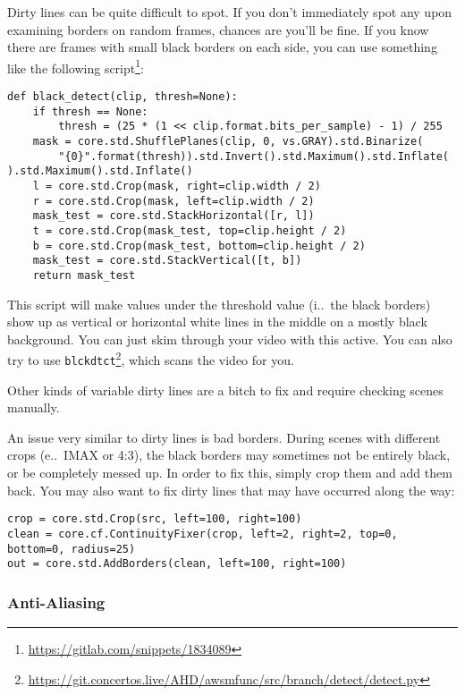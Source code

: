 \documentclass{scrartcl}
\begin{document}
Dirty lines can be quite difficult to spot.  If you don't immediately spot any upon examining borders on random frames, chances are you'll be fine.  If you know there are frames with small black borders on each side, you can use something like the following script\footnote{\url{https://gitlab.com/snippets/1834089}}:

\begin{lstlisting}
def black_detect(clip, thresh=None):
    if thresh == None:
        thresh = (25 * (1 << clip.format.bits_per_sample) - 1) / 255
    mask = core.std.ShufflePlanes(clip, 0, vs.GRAY).std.Binarize(
        "{0}".format(thresh)).std.Invert().std.Maximum().std.Inflate( ).std.Maximum().std.Inflate()
    l = core.std.Crop(mask, right=clip.width / 2)
    r = core.std.Crop(mask, left=clip.width / 2)
    mask_test = core.std.StackHorizontal([r, l])
    t = core.std.Crop(mask_test, top=clip.height / 2)
    b = core.std.Crop(mask_test, bottom=clip.height / 2)
    mask_test = core.std.StackVertical([t, b])
    return mask_test
\end{lstlisting}
This script will make values under the threshold value (i.\@e.\ the black borders) show up as vertical or horizontal white lines in the middle on a mostly black background.  You can just skim through your video with this active.  You can also try to use \texttt{blckdtct}\footnote{\url{https://git.concertos.live/AHD/awsmfunc/src/branch/detect/detect.py}}, which scans the video for you.

Other kinds of variable dirty lines are a bitch to fix and require checking scenes manually.

An issue very similar to dirty lines is bad borders.  During scenes with different crops (e.\@g.\ IMAX or 4:3), the black borders may sometimes not be entirely black, or be completely messed up.  In order to fix this, simply crop them and add them back.  You may also want to fix dirty lines that may have occurred along the way:
\begin{lstlisting}
crop = core.std.Crop(src, left=100, right=100)
clean = core.cf.ContinuityFixer(crop, left=2, right=2, top=0, bottom=0, radius=25)
out = core.std.AddBorders(clean, left=100, right=100)
\end{lstlisting}

\subsubsection{Anti-Aliasing}
\end{document}
